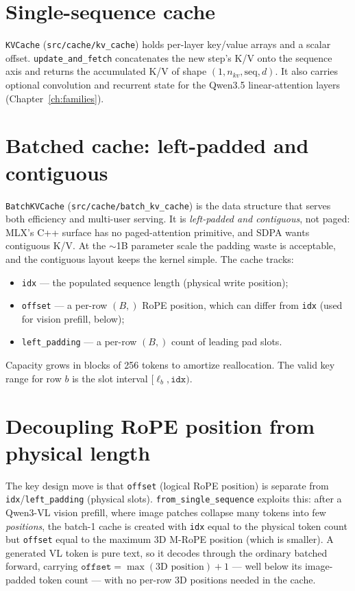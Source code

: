 \documentclass[11pt,a4paper]{report}
\newcommand{\code}[1]{\texttt{#1}}
\begin{document}
\section{Single-sequence cache}
\code{KVCache} (\code{src/cache/kv\_cache}) holds per-layer key/value arrays and a
scalar offset. \code{update\_and\_fetch} concatenates the new step's K/V onto the
sequence axis and returns the accumulated K/V of shape
$(1, n_{kv}, \text{seq}, d)$. It also carries optional convolution and recurrent
state for the Qwen3.5 linear-attention layers (Chapter~\ref{ch:families}).

\section{Batched cache: left-padded and contiguous}
\code{BatchKVCache} (\code{src/cache/batch\_kv\_cache}) is the data structure that
serves both efficiency and multi-user serving. It is \emph{left-padded and
contiguous}, not paged: MLX's C++ surface has no paged-attention primitive, and SDPA
wants contiguous K/V. At the $\sim$1B parameter scale the padding waste is
acceptable, and the contiguous layout keeps the kernel simple. The cache tracks:
\begin{itemize}[nosep]
  \item \code{idx} --- the populated sequence length (physical write position);
  \item \code{offset} --- a per-row $(B,)$ RoPE position, which can differ from
        \code{idx} (used for vision prefill, below);
  \item \code{left\_padding} --- a per-row $(B,)$ count of leading pad slots.
\end{itemize}
Capacity grows in blocks of 256 tokens to amortize reallocation. The valid key range
for row $b$ is the slot interval $[\ell_b, \code{idx})$.

\section{Decoupling RoPE position from physical length}
The key design move is that \code{offset} (logical RoPE position) is separate from
\code{idx}/\code{left\_padding} (physical slots). \code{from\_single\_sequence}
exploits this: after a Qwen3-VL vision prefill, where image patches collapse many
tokens into few \emph{positions}, the batch-1 cache is created with
\code{idx} equal to the physical token count but \code{offset} equal to the maximum
3D M-RoPE position (which is smaller). A generated VL token is pure text, so it
decodes through the ordinary batched forward, carrying
$\code{offset} = \max(\text{3D position}) + 1$ --- well below its image-padded token
count --- with no per-row 3D positions needed in the cache.
\end{document}
